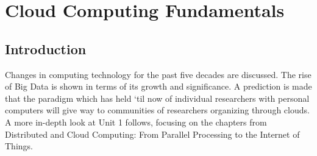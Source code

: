 \chapter{Cloud Computing Fundamentals}
\label{sec:icloud-fundamentals}

\FILENAME

\begin{comment}
  \section{Overview - Completly outdated as old content of class}

  
  The information in this section has been collected by Prof. Judy Qiu
  and taught at INdiana University. The first lecture introduces you
  to the schedule and homework submissions. Key cloud computing topics
  are highlighted. A selection of recommended and required textbooks
  is given, followed by an overview of the course structure. Please
  note that this section will change.

  \video{Cloud}{13:13}{Overview}{https://www.youtube.com/watch?v=Kde5YVUwDTQ}

  \slides{Cloud}{Page 1}{Overview}{https://drive.google.com/open?id=0B88HKpainTSfYjU4QzdDSms0Nk0}

PPT ARE DIFFERNT FROM VIDEO!!! 

  \slides{Cloud}{Page 1}{Overview - pptx}{https://drive.google.com/open?id=0B88HKpainTSfV3p0RUd1REtVTGs}

\end{comment}

\section{Introduction}

Changes in computing technology for the past five decades are discussed.
The rise of Big Data is shown in terms of its growth and significance. A
prediction is made that the paradigm which has held `til now of
individual researchers with personal computers will give way to
communities of researchers organizing through clouds. A more in-depth
look at Unit 1 follows, focusing on the chapters from Distributed and
Cloud Computing: From Parallel Processing to the Internet of Things.

%

